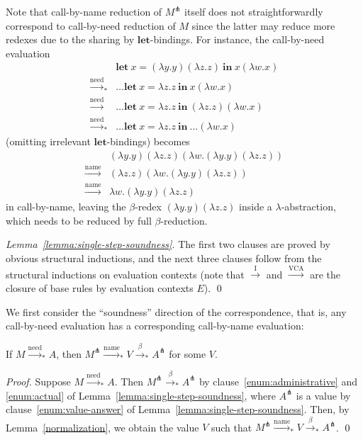 \documentclass[english]{sumiilab-paper}
\newcommand{\LET}[3]{\mathbf{let}~#1=#2~\mathbf{in}~#3}
\newcommand{\EXPANDLET}[1]{#1^\pitchfork}
\newcommand{\FULLBETA}{\xrightarrow{\beta}}
\newcommand{\CALLBYNAME}{\xrightarrow{\mathrm{name}}}
\newcommand{\CALLBYNEED}{\xrightarrow{\mathrm{need}}}
\newcommand{\CALLBYNEEDI}{\xrightarrow{\mathrm{I}}}
\newcommand{\CALLBYNEEDVCA}{\xrightarrow{\mathrm{VCA}}}
\newcommand{\RTCLOS}[1]{#1_*}
\newcommand{\lemmaname}{Lemma}
\begin{document}
Note that call-by-name reduction of $\EXPANDLET{M}$ itself does not straightforwardly correspond to call-by-need reduction of $M$ since the latter may reduce more redexes due to the sharing by $\mathbf{let}$-bindings.  For instance, the call-by-need evaluation
\[\begin{array}{ll}
	& \LET{x}{(\lambda y.y)(\lambda z.z)}{x(\lambda w.x)}\\
	\RTCLOS{\CALLBYNEED} & \dots\LET{x}{\lambda z.z}{x(\lambda w.x)} \\
	\CALLBYNEED & \dots\LET{x}{\lambda z.z}{(\lambda z.z)(\lambda w.x)} \\
	\RTCLOS{\CALLBYNEED} & \dots\LET{x}{\lambda z.z}{\dots(\lambda w.x)}
\end{array}\]
(omitting irrelevant $\mathbf{let}$-bindings) becomes
\[\begin{array}{ll}
	& (\lambda y.y)(\lambda z.z)(\lambda w.(\lambda y.y)(\lambda z.z)) \\
	\CALLBYNAME & (\lambda z.z)(\lambda w.(\lambda y.y)(\lambda z.z)) \\
	\CALLBYNAME & \lambda w. (\lambda y.y)(\lambda z.z)
\end{array} \]
in call-by-name, leaving the $\beta$-redex $(\lambda y.y)(\lambda z.z)$ inside a $\lambda$-abstraction, which needs to be reduced by full $\beta$-reduction.

%
\begin{proof}[\lemmaname~\ref{lemma:single-step-soundness}]
	The first two clauses are proved by obvious structural inductions,
	and the next three clauses follow from the structural inductions on evaluation contexts
	(note that $\CALLBYNEEDI$ and $\CALLBYNEEDVCA$ are the closure of base rules by evaluation contexts $E$). \qed
\end{proof}

We first consider the ``soundness'' direction of the correspondence, that is, any call-by-need evaluation has a corresponding call-by-name evaluation:
\begin{theorem}[soundness]\label{theorem:soundness}
	If $M \RTCLOS{\CALLBYNEED} A$, then $\EXPANDLET{M} \RTCLOS{\CALLBYNAME} V \RTCLOS{\FULLBETA} \EXPANDLET{A}$ for some $V$.
\end{theorem}

\begin{proof}
	Suppose $M \RTCLOS{\CALLBYNEED} A$.  Then $\EXPANDLET{M} \RTCLOS{\FULLBETA} \EXPANDLET{A}$ by clause~\ref{enum:administrative} and \ref{enum:actual} of \lemmaname~\ref{lemma:single-step-soundness}, where $\EXPANDLET{A}$ is a value by clause~\ref{enum:value-answer} of \lemmaname~\ref{lemma:single-step-soundness}.
	Then, by Lemma~\ref{normalization}, we obtain the value $V$ such that $\EXPANDLET{M} \RTCLOS{\CALLBYNAME} V \RTCLOS{\FULLBETA} \EXPANDLET{A}$. \qed
\end{proof}
\end{document}
